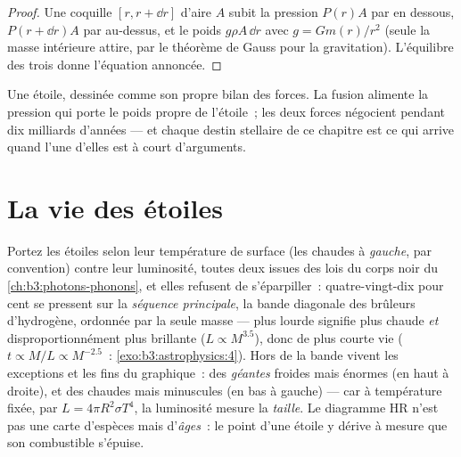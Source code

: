 \begin{proof}
Une coquille $[r, r + \dd r]$ d'aire $A$ subit la pression $P(r)A$
par en dessous, $P(r + \dd r)A$ par au-dessus, et le poids
$g\rho A\,\dd r$ avec $g = Gm(r)/r^2$ (seule la masse intérieure
attire, par le théorème de Gauss pour la gravitation). L'équilibre
des trois donne l'équation annoncée.
\end{proof}

\begin{omfigure}

{\small Une étoile, dessinée comme son propre bilan des forces. La
fusion alimente la pression qui porte le poids propre de l'étoile~;
les deux forces négocient pendant dix milliards d'années --- et
chaque destin stellaire de ce chapitre est ce qui arrive quand l'une
d'elles est à court d'arguments.}
\end{omfigure}

\section{La vie des étoiles}

\begin{definition}\label{def:b3:astrophysics:hr}
Portez les étoiles selon leur température de surface (les chaudes à
\emph{gauche}, par convention) contre leur luminosité, toutes deux
issues des lois du corps noir du \cref{ch:b3:photons-phonons}, et
elles refusent de s'éparpiller~: quatre-vingt-dix pour cent se
pressent sur la \emph{séquence principale}, la bande diagonale des
brûleurs d'hydrogène, ordonnée par la seule masse --- plus lourde
signifie plus chaude \emph{et} disproportionnément plus brillante
($L \propto M^{3.5}$), donc de plus courte vie
($t \propto M/L \propto M^{-2.5}$~:
\cref{exo:b3:astrophysics:4}). Hors de la bande vivent les
exceptions et les fins du graphique~: des \emph{géantes} froides mais
énormes (en haut à droite), et des \emph{} chaudes
mais minuscules (en bas à gauche) --- car à température fixée, par
$L = 4\pi R^2\sigma T^4$, la luminosité mesure la \emph{taille}. Le
diagramme HR n'est pas une carte d'espèces mais d'\emph{âges}~: le
point d'une étoile y dérive à mesure que son combustible s'épuise.
\end{definition}

